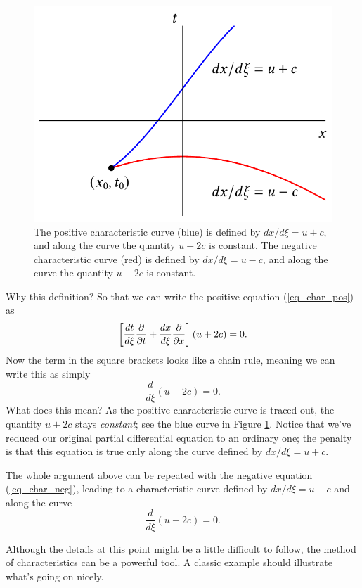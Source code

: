 \begin{figure}
\centering
\includegraphics[width=0.7\linewidth]{Figures/Chapter6/fig_nonlinear_curves}
\caption{The positive characteristic curve (blue) is defined by $dx/d\xi = u+c$, and along the curve the quantity $u+2c$ is constant.  The negative characteristic curve (red) is defined by $dx/d\xi = u-c$, and along the curve the quantity $u - 2c$ is constant. }
\label{fig_nonlinear_curves}
\end{figure}

Why this definition?  So that we can write the positive equation (\ref{eq_char_pos}) as
\[
\left[ \frac{dt}{d\xi} \frac{\partial {}}{\partial {t}} + \frac{dx}{d\xi} \frac{\partial {}}{\partial {x}} \right] (u + 2c) = 0.
\]
Now the term in the square brackets looks like a chain rule, meaning we can write this as simply
\begin{equation}
\boxed{
\frac{d}{d\xi} (u + 2c) = 0.
}
\end{equation}
What does this mean?  As the positive characteristic curve is traced out, the quantity $u+2c$ stays \emph{constant}; see the blue curve in Figure \ref{fig_nonlinear_curves}.  Notice that we've reduced our original partial differential equation to an ordinary one; the penalty is that this equation is true only along the curve defined by $dx/d\xi = u+c$.

The whole argument above can be repeated with the negative equation (\ref{eq_char_neg}), leading to a characteristic curve defined by $dx/d\xi = u-c$ and along the curve
\begin{equation}
\boxed{
\frac{d}{d\xi} (u - 2c) = 0.
}
\end{equation}

Although the details at this point might be a little difficult to follow, the method of characteristics can be a powerful tool.  A classic example should illustrate what's going on nicely.

